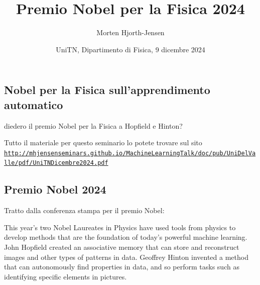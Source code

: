 \documentclass[%
oneside,                 %
final,                   %
10pt]{article}
\begin{document}

\newcommand{\exercisesection}[1]{\subsection*{#1}}






\title{Premio Nobel per la  Fisica 2024}


\author{Morten Hjorth-Jensen}

\date{UniTN, Dipartimento di Fisica, 9 dicembre 2024
}

\subsection{Nobel per la  Fisica  sull'apprendimento automatico}

\begin{block}{}
 diedero il premio Nobel per la Fisica a Hopfield e Hinton? 
\end{block}

\begin{block}{}
Tutto il materiale per questo seminario lo potete trovare sul sito  \href{{http://mhjensenseminars.github.io/MachineLearningTalk/doc/pub/UniDelValle/pdf/UniTNDicembre2024.pdf}}{\nolinkurl{http://mhjensenseminars.github.io/MachineLearningTalk/doc/pub/UniDelValle/pdf/UniTNDicembre2024.pdf}}
\end{block}

\subsection{Premio Nobel 2024}

Tratto dalla conferenza stampa per il premio Nobel:
\begin{block}{}
This year’s two Nobel Laureates in Physics have used tools from
physics to develop methods that are the foundation of today’s powerful
machine learning. John Hopfield created an associative memory that can
store and reconstruct images and other types of patterns in
data. Geoffrey Hinton invented a method that can autonomously find
properties in data, and so perform tasks such as identifying specific
elements in pictures.
\end{block}
\end{document}
